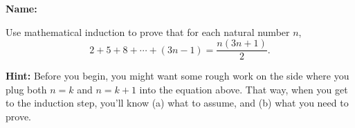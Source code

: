 \documentclass[12pt]{article}
\begin{document}
{\bf Name:}
\thispagestyle{fancy}

\bigskip


Use mathematical induction to prove that for each natural number $n$,
\[
 2+5+8+\cdots + (3n-1) = \frac{n(3n+1)}{2}.
\]

{\bf Hint:} Before you begin, you might want some rough work on the side where you plug both $n=k$ and $n=k+1$ into the equation above. That way, when you get to the induction step, you'll know (a) what to assume, and (b) what you need to prove.
\end{document}

